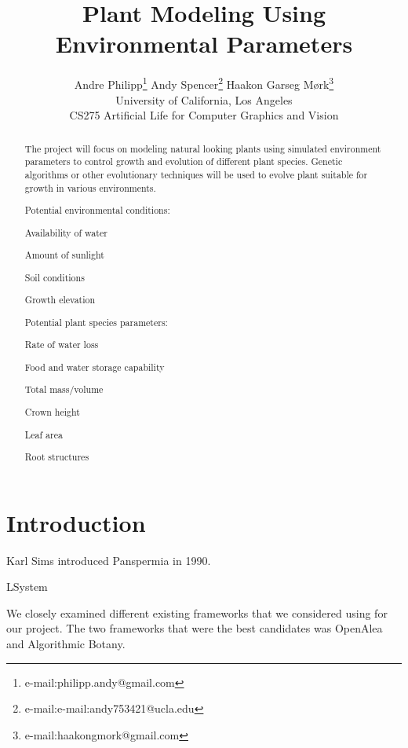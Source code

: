 \documentclass[conference]{acmsiggraph}
\title{Plant Modeling Using Environmental Parameters}
\author{
  Andre Philipp\thanks{e-mail:philipp.andy@gmail.com}
  \qquad
  Andy Spencer\thanks{e-mail:e-mail:andy753421@ucla.edu}
  \qquad
  Haakon Garseg Mørk\thanks{e-mail:haakongmork@gmail.com}
  \\
  University of California, Los Angeles \\
  CS275 Artificial Life for Computer Graphics and Vision
}
\begin{document}

\maketitle

\begin{abstract}

The project will focus on modeling natural looking plants using simulated
environment parameters to control growth and evolution of different plant
species. Genetic algorithms or other evolutionary techniques will be used to
evolve plant suitable for growth in various environments.

Potential environmental conditions:

\begin{itemize*}
  \item Availability of water
  \item Amount of sunlight
  \item Soil conditions
  \item Growth elevation
\end{itemize*}

Potential plant species parameters:

\begin{itemize*}
  \item Rate of water loss
  \item Food and water storage capability
  \item Total mass/volume
  \item Crown height
  \item Leaf area
  \item Root structures
\end{itemize*}

\end{abstract}

\keywordlist


\section{Introduction}

Karl Sims introduced Panspermia in 1990.

LSystem

We closely examined different existing frameworks that we considered using for
our project. The two frameworks that were the best candidates was
OpenAlea\cite{openalea} and Algorithmic Botany\cite{abotany}.
\end{document}
